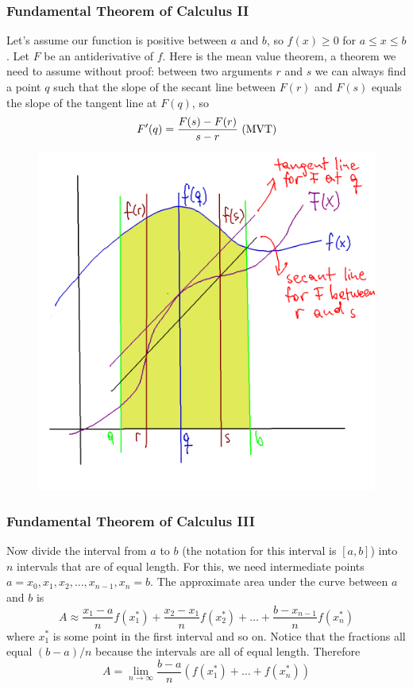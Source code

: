 \documentclass[xcolor=dvipsnames]{beamer}
\begin{document}
\begin{frame}
  \frametitle{Fundamental Theorem of Calculus II}
Let's assume our function is positive between $a$ and $b$, so
$f(x)\geq{}0$ for $a\leq{}x\leq{}b$. Let $F$ be an antiderivative of
$f$. Here is the \alert{mean value theorem}, a theorem we need to
assume without proof: between two arguments $r$ and $s$ we can always
find a point $q$ such that the slope of the secant line between $F(r)$
and $F(s)$ equals the slope of the tangent line at $F(q)$, so
\begin{equation}
  \label{eq:zahrahsi}
  F'(q)=\frac{F(s)-F(r)}{s-r}\mbox{ (MVT)}\notag
\end{equation}
\begin{figure}[h]
\includegraphics[scale=.13]{./ftoc-01.png}
\end{figure}
\end{frame}

\begin{frame}
  \frametitle{Fundamental Theorem of Calculus III}
Now divide the interval from $a$ to $b$ (the notation for this
interval is $[a,b]$) into $n$ intervals that are of equal length. For
this, we need intermediate points
$a=x_{0},x_{1},x_{2},\ldots,x_{n-1},x_{n}=b$. The approximate area
under the curve between $a$ and $b$ is
\begin{equation}
  \label{eq:eikaidei}
  A\approx\frac{x_{1}-a}{n}f(x_{1}^{*})+\frac{x_{2}-x_{1}}{n}f(x_{2}^{*})+\ldots+\frac{b-x_{n-1}}{n}f(x_{n}^{*})
\end{equation}
where $x_{1}^{*}$ is some point in the first interval and so on.
Notice that the fractions all equal $(b-a)/n$ because the intervals
are all of equal length. Therefore
\begin{equation}
  \label{eq:pukaepha}
  A=\lim_{n\rightarrow\infty}\frac{b-a}{n}\left(f(x_{1}^{*})+\ldots+f(x_{n}^{*})\right)
\end{equation}
\end{frame}
\end{document}
